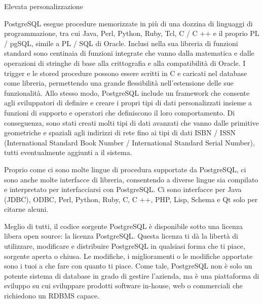 Elevata personalizzazione

PostgreSQL esegue procedure memorizzate in più di una dozzina di linguaggi di programmazione, tra cui Java, Perl, Python, Ruby, Tcl, C / C ++ e il proprio PL / pgSQL, simile a PL / SQL di Oracle. Inclusi nella sua libreria di funzioni standard sono centinaia di funzioni integrate che vanno dalla matematica e dalle operazioni di stringhe di base alla crittografia e alla compatibilità di Oracle. I trigger e le stored procedure possono essere scritti in C e caricati nel database come libreria, permettendo una grande flessibilità nell'estensione delle sue funzionalità. Allo stesso modo, PostgreSQL include un framework che consente agli sviluppatori di definire e creare i propri tipi di dati personalizzati insieme a funzioni di supporto e operatori che definiscono il loro comportamento. Di conseguenza, sono stati creati molti tipi di dati avanzati che vanno dalle primitive geometriche e spaziali agli indirizzi di rete fino ai tipi di dati ISBN / ISSN (International Standard Book Number / International Standard Serial Number), tutti eventualmente aggiunti a il sistema.

Proprio come ci sono molte lingue di procedura supportate da PostgreSQL, ci sono anche molte interfacce di libreria, consentendo a diverse lingue sia compilato e interpretato per interfacciarsi con PostgreSQL. Ci sono interfacce per Java (JDBC), ODBC, Perl, Python, Ruby, C, C ++, PHP, Lisp, Schema e Qt solo per citarne alcuni.

Meglio di tutti, il codice sorgente PostgreSQL è disponibile sotto una licenza libera open source: la licenza PostgreSQL. Questa licenza ti dà la libertà di utilizzare, modificare e distribuire PostgreSQL in qualsiasi forma che ti piace, sorgente aperta o chiusa. Le modifiche, i miglioramenti o le modifiche apportate sono i tuoi a che fare con quanto ti piace. Come tale, PostgreSQL non è solo un potente sistema di database in grado di gestire l'azienda, ma è una piattaforma di sviluppo su cui sviluppare prodotti software in-house, web o commerciali che richiedono un RDBMS capace.


